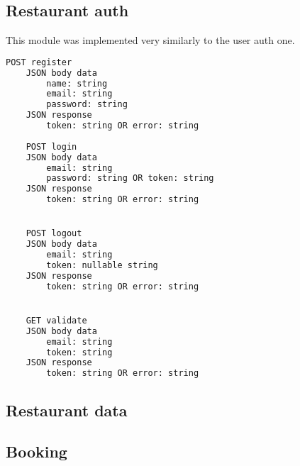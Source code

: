 \subsection{Restaurant auth}

This module was implemented very similarly to the user auth one.


\begin{lstlisting}[language=bash,caption={Restaurant auth exposed API}]
    POST register
    JSON body data
        name: string
        email: string
        password: string
    JSON response
        token: string OR error: string
        
    POST login
    JSON body data
        email: string
        password: string OR token: string
    JSON response
        token: string OR error: string


    POST logout
    JSON body data
        email: string
        token: nullable string
    JSON response
        token: string OR error: string


    GET validate
    JSON body data
        email: string
        token: string
    JSON response
        token: string OR error: string
\end{lstlisting}

\subsection{Restaurant data}


\subsection{Booking}


